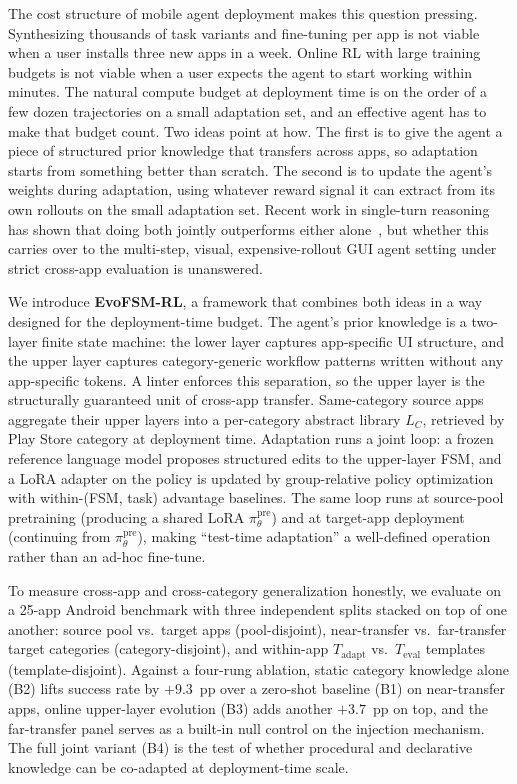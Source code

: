 The cost structure of mobile agent deployment makes this question pressing. Synthesizing thousands of task variants and fine-tuning per app is not viable when a user installs three new apps in a week. Online RL with large training budgets is not viable when a user expects the agent to start working within minutes. The natural compute budget at deployment time is on the order of a few dozen trajectories on a small adaptation set, and an effective agent has to make that budget count. Two ideas point at how. The first is to give the agent a piece of structured prior knowledge that transfers across apps, so adaptation starts from something better than scratch. The second is to update the agent's weights during adaptation, using whatever reward signal it can extract from its own rollouts on the small adaptation set. Recent work in single-turn reasoning has shown that doing both jointly outperforms either alone~\citep{zhang2026espl}, but whether this carries over to the multi-step, visual, expensive-rollout GUI agent setting under strict cross-app evaluation is unanswered.

We introduce \textbf{EvoFSM-RL}, a framework that combines both ideas in a way designed for the deployment-time budget. The agent's prior knowledge is a two-layer finite state machine: the lower layer captures app-specific UI structure, and the upper layer captures category-generic workflow patterns written without any app-specific tokens. A linter enforces this separation, so the upper layer is the structurally guaranteed unit of cross-app transfer. Same-category source apps aggregate their upper layers into a per-category abstract library $L_C$, retrieved by Play Store category at deployment time. Adaptation runs a joint loop: a frozen reference language model proposes structured edits to the upper-layer FSM, and a LoRA adapter on the policy is updated by group-relative policy optimization with within-(FSM, task) advantage baselines. The same loop runs at source-pool pretraining (producing a shared LoRA $\pi^{\text{pre}}_\theta$) and at target-app deployment (continuing from $\pi^{\text{pre}}_\theta$), making ``test-time adaptation'' a well-defined operation rather than an ad-hoc fine-tune.

To measure cross-app and cross-category generalization honestly, we evaluate on a 25-app Android benchmark with three independent splits stacked on top of one another: source pool vs.\ target apps (pool-disjoint), near-transfer vs.\ far-transfer target categories (category-disjoint), and within-app $T_{\text{adapt}}$ vs.\ $T_{\text{eval}}$ templates (template-disjoint). Against a four-rung ablation, static category knowledge alone (B2) lifts success rate by $+9.3$~pp over a zero-shot baseline (B1) on near-transfer apps, online upper-layer evolution (B3) adds another $+3.7$~pp on top, and the far-transfer panel serves as a built-in null control on the injection mechanism. The full joint variant (B4) is the test of whether procedural and declarative knowledge can be co-adapted at deployment-time scale.


